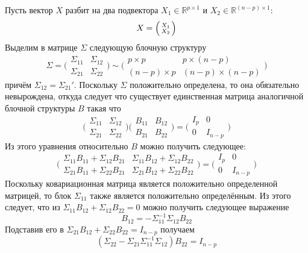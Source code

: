 \documentclass[a4paper]{article}
\newcommand{\Real}{\mathbb{R}}
\begin{document}
Пусть вектор $X$ разбит на два подвектора $X_1\in \Real^{p\times 1}$ и $X_2\in \Real^{(n-p)\times 1}$:
\[X = \Bigl(\begin{smallmatrix} X_1 \\ X_2 \end{smallmatrix}\Bigr)\]
Выделим в матрице $\Sigma$ следующую блочную структуру
\[
\Sigma
= \biggl(\begin{matrix}\Sigma_{11} & \Sigma_{12}\\\Sigma_{21} & \Sigma_{22}\end{matrix}\biggr)
\sim \biggl(\begin{matrix}p\times p & p\times (n-p)\\(n-p)\times p & (n-p)\times (n-p)\end{matrix}\biggr)
\]
причём $\Sigma_{12} = \Sigma_{21}'$. Поскольку $\Sigma$ положительно определена,
то она обязательно невырождена, откуда следует что существует единственная матрица
аналогичной блочной структуры $B$ такая что
\[
\biggl(\begin{matrix}\Sigma_{11} & \Sigma_{12}\\\Sigma_{21} & \Sigma_{22}\end{matrix}\biggr)
\biggl(\begin{matrix}B_{11} & B_{12}\\B_{21} & B_{22}\end{matrix}\biggr)
=
\biggl(\begin{matrix}I_p & 0\\0 & I_{n-p}\end{matrix}\biggr)
\]
Из этого уравнения относительно $B$ можно получить следующее:
\[
\biggl(\begin{matrix}
\Sigma_{11}B_{11} + \Sigma_{12}B_{21} & \Sigma_{11}B_{12} + \Sigma_{12}B_{22} \\
\Sigma_{21}B_{11} + \Sigma_{22}B_{21} & \Sigma_{21}B_{12} + \Sigma_{22}B_{22}
\end{matrix}\biggr)
= \biggl(\begin{matrix}I_p & 0\\0 & I_{n-p}\end{matrix}\biggr)
\]
Поскольку ковариационная матрица является положительно определенной матрицей,
то блок $\Sigma_{11}$ также является положительно определённым. Из этого следует,
что из $\Sigma_{11}B_{12} + \Sigma_{12}B_{22}=0$ можно получить следующее выражение
\[B_{12} = -\Sigma_{11}^{-1} \Sigma_{12}B_{22}\]
Подставив его в $\Sigma_{21}B_{12} + \Sigma_{22}B_{22} = I_{n-p}$ получаем
\[
( \Sigma_{22} - \Sigma_{21}\Sigma_{11}^{-1} \Sigma_{12} ) B_{22} = I_{n-p}
\]
\end{document}
